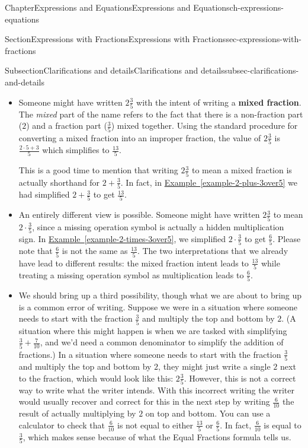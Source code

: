 \documentclass[twoside,11pt,]{book}
\newcommand{\xreffont}{\relax}
\newcommand{\terminology}[1]{\textbf{#1}}
\numberwithin{equation}{chapter}
\begin{document}
\begin{chapterptx}{Chapter}{Expressions and Equations}{}{Expressions and Equations}{}{}{ch-expressions-equations}
\begin{sectionptx}{Section}{Expressions with Fractions}{}{Expressions with Fractions}{}{}{sec-expressions-with-fractions}
\begin{subsectionptx}{Subsection}{Clarifications and details}{}{Clarifications and details}{}{}{subsec-clarifications-and-details}
\begin{itemize}[label=\textbullet]
\item{}Someone might have written \(2 \frac{3}{5}\) with the intent of writing a \terminology{mixed fraction}. The \emph{mixed} part of the name refers to the fact that there is a non-fraction part (\(2\)) and a fraction part (\(\frac{3}{5}\)) mixed together. Using the standard procedure for converting a mixed fraction into an improper fraction, the value of \(2 \frac{3}{5}\) is \(\frac{2 \cdot 5 + 3}{5}\) which simplifies to \(\frac{13}{5}\).%
\par
This is a good time to mention that writing \(2 \frac{3}{5}\) to mean a mixed fraction is actually shorthand for \(2 + \frac{3}{5}\). In fact, in \hyperref[example-2-plus-3over5]{Example~{\xreffont\ref{example-2-plus-3over5}}} we had simplified \(2 + \frac{3}{5}\) to get \(\frac{13}{5}\).%
\item{}An entirely different view is possible. Someone might have written \(2 \frac{3}{5}\) to mean \(2 \cdot \frac{3}{5}\), since a missing operation symbol is actually a hidden multiplication sign. In \hyperref[example-2-times-3over5]{Example~{\xreffont\ref{example-2-times-3over5}}}, we simplified \(2 \cdot \frac{3}{5}\) to get \(\frac{6}{5}\). Please note that \(\frac{6}{5}\) is not the same as \(\frac{13}{5}\). The two interpretations that we already have lead to different results: the mixed fraction intent leads to \(\frac{13}{5}\) while treating a missing operation symbol as multiplication leads to \(\frac{6}{5}\).%
\item{}We should bring up a third possibility, though what we are about to bring up is a common error of writing. Suppose we were in a situation where someone needs to start with the fraction \(\frac{3}{5}\) and multiply the top and bottom by \(2\). (A situation where this might happen is when we are tasked with simplifying \(\frac35 + \frac7{10}\), and we'd need a common denominator to simplify the addition of fractions.) In a situation where someone needs to start with the fraction \(\frac35\) and multiply the top and bottom by \(2\), they might just write a single \(2\) next to the fraction, which would look like this: \(2 \frac{3}{5}\). However, this is not a correct way to write what the writer intends. With this incorrect writing the writer would usually recover and correct for this in the next step by writing \(\frac{6}{10}\) the result of actually multiplying by \(2\) on top and bottom. You can use a calculator to check that \(\frac{6}{10}\) is not equal to either \(\frac{13}{5}\) or \(\frac{6}{5}\). In fact, \(\frac{6}{10}\) is equal to \(\frac{3}{5}\), which makes sense because of what the Equal Fractions formula tells us.%

\end{itemize}
\end{subsectionptx}
\end{sectionptx}
\end{chapterptx}
\end{document}
